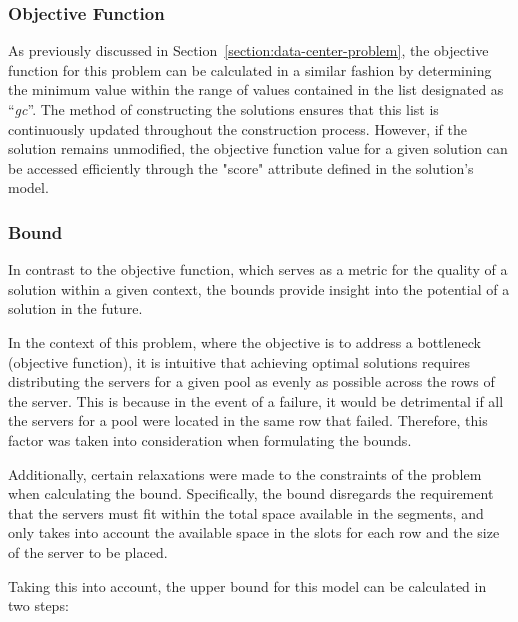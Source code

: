\subsubsection{Objective Function} \label{section:
  data-center-objective-function}

As previously discussed in Section~\ref{section:data-center-problem}, the
objective function for this problem can be calculated in a similar fashion by
determining the minimum value within the range of values contained in the list
designated as ``\textit{gc}''. The method of constructing the solutions ensures
that this list is continuously updated throughout the construction process.
However, if the solution remains unmodified, the objective function value for a
given solution can be accessed efficiently through the "score" attribute defined
in the solution's model.

\subsubsection{Bound} \label{section:data-center-bound}

In contrast to the objective function, which serves as a metric for the quality
of a solution within a given context, the bounds provide insight into the
potential of a solution in the future.

In the context of this problem, where the objective is to address a bottleneck
(objective function), it is intuitive that achieving optimal solutions requires
distributing the servers for a given pool as evenly as possible across the rows
of the server. This is because in the event of a failure, it would be
detrimental if all the servers for a pool were located in the same row that
failed. Therefore, this factor was taken into consideration when formulating the
bounds.

Additionally, certain relaxations were made to the constraints of the problem
when calculating the bound. Specifically, the bound disregards the requirement
that the servers must fit within the total space available in the segments, and
only takes into account the available space in the slots for each row and the
size of the server to be placed.

Taking this into account, the upper bound for this model can be calculated in
two steps:

